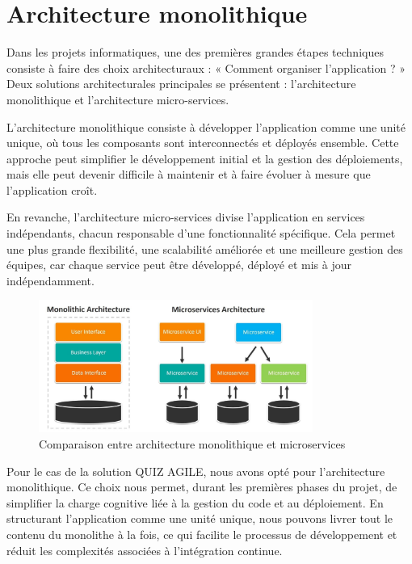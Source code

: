 \documentclass[12pt,a4paper]{report}
\begin{document}
\section{Architecture monolithique}

Dans les projets informatiques, une des premières grandes étapes techniques consiste à faire des choix architecturaux : « Comment organiser l'application ? » Deux solutions architecturales principales se présentent : l'architecture monolithique et l'architecture micro-services.

L'architecture monolithique consiste à développer l'application comme une unité unique, où tous les composants sont interconnectés et déployés ensemble. Cette approche peut simplifier le développement initial et la gestion des déploiements, mais elle peut devenir difficile à maintenir et à faire évoluer à mesure que l'application croît.

En revanche, l'architecture micro-services divise l'application en services indépendants, chacun responsable d'une fonctionnalité spécifique. Cela permet une plus grande flexibilité, une scalabilité améliorée et une meilleure gestion des équipes, car chaque service peut être développé, déployé et mis à jour indépendamment.

\begin{figure}[H]
\centering
\includegraphics[width=0.8\textwidth]{latex_media/media/image15.jpeg}
\caption{Comparaison entre architecture monolithique et microservices}
\label{fig:comparaison-architectures}
\end{figure}

Pour le cas de la solution QUIZ AGILE, nous avons opté pour l'architecture monolithique. Ce choix nous permet, durant les premières phases du projet, de simplifier la charge cognitive liée à la gestion du code et au déploiement. En structurant l'application comme une unité unique, nous pouvons livrer tout le contenu du monolithe à la fois, ce qui facilite le processus de développement et réduit les complexités associées à l'intégration continue.
\end{document}
